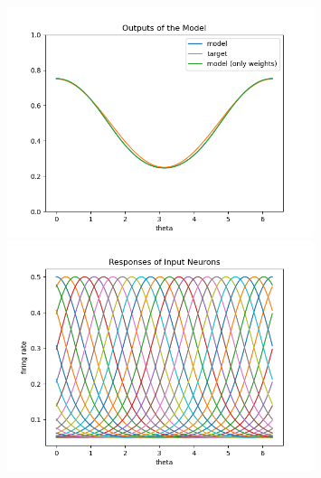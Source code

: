 \documentclass[12pt, a4paper]{article}
\begin{document}
\begin{figure}[H]
    \centering
    \includegraphics[width=0.8\textwidth]{FNN/fig/0221_abb05_bphebb_output.png} \\
    \includegraphics[width=0.8\textwidth]{FNN/fig/0221_abb05_bphebb_rf.png}
\end{figure}
\end{document}
